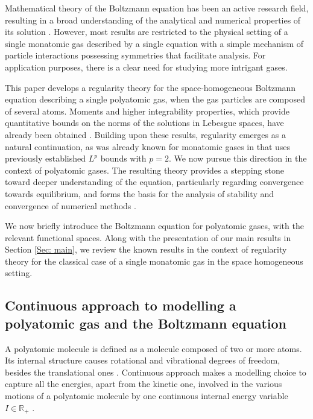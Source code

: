 \documentclass[11pt,a4paper]{amsart}
\begin{document}
Mathematical theory of the Boltzmann equation has been an active research field, resulting in a broad understanding of the analytical and numerical properties of its solution \cite{V}. However, most results are restricted to the physical setting of a single monatomic gas described by a single equation with a simple mechanism of particle interactions possessing symmetries that facilitate analysis. For application purposes, there is a clear need for studying more intrigant gases.


 
This paper develops a regularity theory for the space-homogeneous Boltzmann equation describing a single polyatomic gas, when the gas particles are composed of several atoms. Moments and higher integrability properties, which provide quantitative bounds on the norms of the solutions in Lebesgue spaces, have already been obtained \cite{MPC-IG-poly, MC-Alonso-Gamba, MC-Alonso-Lp, MC-Alonso-Pesaro}. Building upon these results, regularity emerges as a natural continuation, as was already known for monatomic gases in \cite{L,BD,MV}  that uses previously established $L^p$ bounds with $p=2$. We now pursue this direction in the context of polyatomic gases. The resulting theory provides a stepping stone toward deeper understanding of the equation, particularly regarding convergence towards equilibrium, and forms the basis for the analysis of stability and convergence of numerical methods \cite{AGT-S}.

 
We now briefly introduce the Boltzmann equation for polyatomic gases, with the relevant functional spaces. Along with the presentation of our main results in Section \ref{Sec: main}, we review the known results in the context of regularity theory for the  classical case of a single monatomic gas in the space homogeneous setting.


\subsection{Continuous approach to modelling a polyatomic gas and the Boltzmann equ\-ation} A polyatomic molecule is defined as a molecule composed of   two or more atoms. Its internal  structure causes rotational and vibrational degrees of freedom, besides the translational ones \cite{Rugg-book-2}. Continuous approach makes a modelling choice to capture all the energies, apart from the kinetic one, involved in the various motions of a polyatomic molecule by one continuous internal  energy variable $I \in \mathbb{R}_+$ \cite{LD-Bourgat,LD-Toulouse,DesMonSalv}. %
\end{document}
